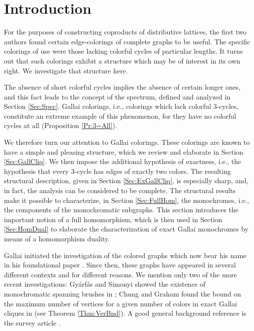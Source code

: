\documentclass[12pt]{amsart}
\theoremstyle{plain}
\numberwithin{equation}{section}
\begin{document}
\maketitle

\section{Introduction}

For the purposes of constructing coproducts of distributive lattices, the
first two authors found certain edge-colorings of complete graphs to be
useful. The specific colorings of use were those lacking colorful cycles of
particular lengths. It turns out that such colorings exhibit a structure which
may be of interest in its own right. We investigate that structure here.

The absence of short colorful cycles implies the absence of certain longer
ones, and this fact leads to the concept of the spectrum, defined and analyzed
in Section \ref{Sec:Spec}. Gallai colorings, i.e., colorings which lack
colorful 3-cycles, constitute an extreme example of this phenomenon, for they
have no colorful cycles at all (Proposition \ref{Pr:3=All}).

We therefore turn our attention to Gallai colorings. These colorings are known
to have a simple and pleasing structure, which we review and elaborate in
Section \ref{Sec:GallCliq}. We then impose the additional hypothesis of
exactness, i.e., the hypothesis that every 3-cycle has edges of exactly two
colors. The resulting structural description, given in Section
\ref{Sec:ExGallCliq}, is especially sharp, and, in fact, the analysis can be
considered to be complete. The structural results make it possible to
characterize, in Section \ref{Sec:FullHom}, the monochromes, i.e., the
components of the monochromatic subgraphs. This section introduces the
important notion of a full homomorphism, which is then used in Section
\ref{Sec:HomDual} to elaborate the characterization of exact Gallai monochromes
by means of a homomorphism duality.

Gallai initiated the investigation of the colored graphs which now bear his
name in his foundational paper \cite{Gallai:1967}. Since then, these graphs
have appeared in several different contexts and for different reasons. We
mention only two of the more recent investigations: Gy\'{a}rf\'{a}s and Simonyi
showed the existence of monochromatic spanning brushes in
\cite{GyarfasSimonyi:2004}; Chung and Graham found the bound on the maximum
number of vertices for a given number of colors in exact Gallai cliques in
\cite{ChungGraham:1983} (see Theorem \ref{Thm:VerBnd}). A good general
background reference is the survey article \cite{Nesetril:1995}.
\end{document}
